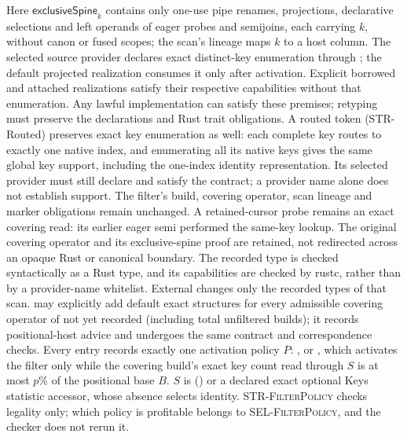 Here $\mathsf{exclusiveSpine}_k$ contains only one-use pipe renames,
projections, declarative selections and left operands of eager probes and
semijoins, each carrying $k$, without canon or fused scopes; the scan's
lineage maps $k$ to a host column.
The selected source provider declares exact distinct-key enumeration through
; the default projected realization consumes it only after activation.
Explicit borrowed and attached realizations satisfy their respective capabilities
without that enumeration. Any lawful implementation can satisfy these premises;
retyping must preserve the declarations and Rust trait obligations.
A routed token (STR-Routed) preserves exact key enumeration as well: each
complete key routes to exactly one native index, and enumerating all its native
keys gives the same global key support, including the one-index identity
representation. Its selected provider must still declare and satisfy the
 contract; a provider name alone does not establish support.
The filter's build, covering operator, scan lineage and marker obligations
remain unchanged.
A retained-cursor probe remains an exact covering read: its earlier eager
semi performed the same-key lookup. The original covering operator and its
exclusive-spine proof are retained, not redirected across an opaque Rust or
canonical boundary.
The recorded type is checked syntactically as a Rust type, and its capabilities
are checked by rustc, rather than by a provider-name whitelist. External
 changes only the recorded types of that scan.
 may explicitly add default exact structures for every
admissible covering operator of  not yet recorded (including total
unfiltered builds); it records positional-host advice and undergoes the same
contract and correspondence checks.
Every entry records exactly one activation policy $P$:
, or , which activates the filter only
while the covering build's exact key count read through $S$ is at most $p\%$ of
the positional base $B$. $S$ is  () or a
declared exact optional Keys statistic accessor, whose absence selects identity.
\textsc{STR-FilterPolicy} checks legality only; which policy is profitable
belongs to \textsc{SEL-FilterPolicy}, and the checker does not rerun it.
\begin{mathpar}
\end{mathpar}

